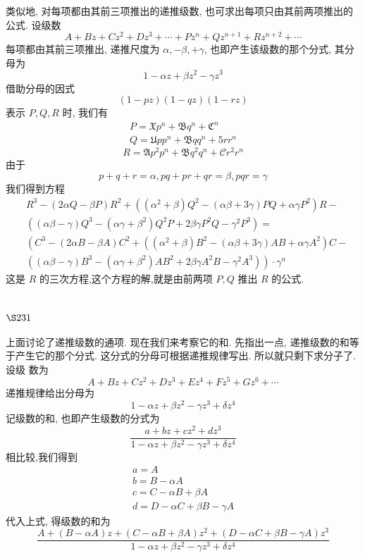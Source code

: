 类似地, 对每项都由其前三项推出的递推级数, 也可求出每项只由其前两项推出的 公式. 设级数
\[
A+B z+C z^{2}+D z^{3}+\cdots+P z^{n}+Q z^{n+1}+R z^{n+2}+\cdots
\]
每项都由其前三项推出, 递推尺度为 $\alpha,-\beta,+\gamma$, 也即产生该级数的那个分式, 其分母为
\[
1-\alpha z+\beta z^{2}-\gamma z^{3}
\]
借助分母的因式
\[
(1-p z)(1-q z)(1-r z)
\]
表示 $P, Q, R$ 时, 我们有
\[
\begin{gathered}
P=\mathfrak{X} p^{n}+\mathfrak{B} q^{n}+\mathfrak{C}^{n} \\
Q=\mathfrak{U} p p^{n}+\mathfrak{B} q q^{n}+\mathfrak{5} r r^{n}
\end{gathered}
\]
\[
 R=\mathfrak{A} p^{2} p^{n}+\mathfrak{B} q^{2} q^{n}+\mathscr{C} r^{2} r^{n}
\]
由于
\[
p+q+r=\alpha, p q+p r+q r=\beta, p q r=\gamma
\]
我们得到方程
\[
\begin{aligned}
& R^{3}-(2 \alpha Q-\beta P) R^{2}+\left(\left(\alpha^{2}+\beta\right) Q^{2}-(\alpha \beta+3 \gamma) P Q+\alpha \gamma P^{2}\right) R- \\
& \left((\alpha \beta-\gamma) Q^{3}-\left(\alpha \gamma+\beta^{2}\right) Q^{2} P+2 \beta \gamma P^{2} Q-\gamma^{2} P^{3}\right)= \\
& \left(C^{3}-(2 \alpha B-\beta A) C^{2}+\left(\left(\alpha^{2}+\beta\right) B^{2}-(\alpha \beta+3 \gamma) A B+\alpha \gamma A^{2}\right) C-\right. \\
& \left.\left((\alpha \beta-\gamma) B^{3}-\left(\alpha \gamma+\beta^{2}\right) A B^{2}+2 \beta \gamma A^{2} B-\gamma^{2} A^{3}\right)\right) \cdot \gamma^{n}
\end{aligned}
\]
这是 $R$ 的三次方程,这个方程的解,就是由前两项 $P, Q$ 推出 $R$ 的公式.

\section{$\S 231$}

上面讨论了递推级数的通项. 现在我们来考察它的和. 先指出一点, 递推级数的和等 于产生它的那个分式. 这分式的分母可根据递推规律写出. 所以就只剩下求分子了. 设级 数为
\[
A+B z+C z^{2}+D z^{3}+E z^{4}+F z^{5}+G z^{6}+\cdots
\]
递推规律给出分母为
\[
1-\alpha z+\beta z^{2}-\gamma z^{3}+\delta z^{4}
\]
记级数的和, 也即产生级数的分式为
\[
\frac{a+b z+c z^{2}+d z^{3}}{1-\alpha z+\beta z^{2}-\gamma z^{3}+\delta z^{4}}
\]
相比较,我们得到
\[
\begin{gathered}
a=A \\
b=B-\alpha A \\
c=C-\alpha B+\beta A \\
d=D-\alpha C+\beta B-\gamma A
\end{gathered}
\]
代入上式, 得级数的和为
\[
\frac{A+(B-\alpha A) z+(C-\alpha B+\beta A) z^{2}+(D-\alpha C+\beta B-\gamma A) z^{3}}{1-\alpha z+\beta z^{2}-\gamma z^{3}+\delta z^{4}} 
\]
